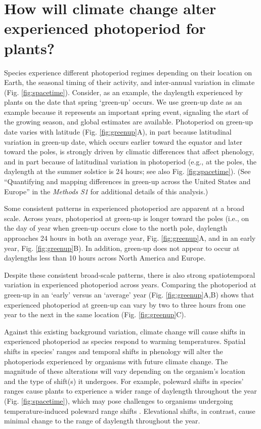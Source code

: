 \documentclass{article}
\begin{document}
\section*{How will climate change alter experienced photoperiod for plants?}
\par Species experience different photoperiod regimes depending on their location on Earth, the seasonal timing of their activity, and inter-annual variation in climate (Fig. \ref{fig:spacetime}). Consider, as an example, the daylength experienced by plants on the date that spring `green-up' occurs. We use green-up date as an example because it represents an important spring event, signaling the start of the growing season, and global estimates are available. Photoperiod on green-up date varies with latitude (Fig. \ref{fig:greenup}A), in part because latitudinal variation in green-up date, which occurs earlier toward the equator and later toward the poles, is strongly driven by climatic differences that affect phenology, and in part because of latitudinal variation in photoperiod (e.g., at the poles, the daylength at the summer solstice is 24 hours; see also Fig. \ref{fig:spacetime}). (See ``Quantifying and mapping differences in green-up across the United States and Europe'' in the \emph{Methods S1} for additional details of this analysis.) 
\par Some consistent patterns in experienced photoperiod are apparent at a broad scale. Across years, photoperiod at green-up is longer toward the poles (i.e., on the day of year when green-up occurs close to the north pole, daylength approaches 24 hours in both an average year, Fig. \ref{fig:greenup}A, and in an early year, Fig. \ref{fig:greenup}B). In addition, green-up does not appear to occur at daylengths less than 10 hours across North America and Europe. 
\par Despite these consistent broad-scale patterns, there is also strong spatiotemporal variation in experienced photoperiod across years. Comparing the photoperiod at green-up in an `early' versus an `average' year (Fig. \ref{fig:greenup}A,B) shows that experienced photoperiod at green-up can vary by two to three hours from one year to the next in the same location (Fig. \ref{fig:greenup}C).

\par Against this existing background variation, climate change will cause shifts in experienced photoperiod as species respond to warming temperatures. Spatial shifts in species' ranges and temporal shifts in phenology will alter the photoperiods experienced by organisms with future climate change. The magnitude of these alterations will vary depending on the organism's location and the type of shift(s) it undergoes. For example, poleward shifts in species' ranges cause plants to experience a wider range of daylength throughout the year (Fig. \ref{fig:spacetime}), which may pose challenges to organisms undergoing temperature-induced poleward range shifts \citep{huffeldt2020}. Elevational shifts, in contrast, cause minimal change to the range of daylength throughout the year.
\end{document}
